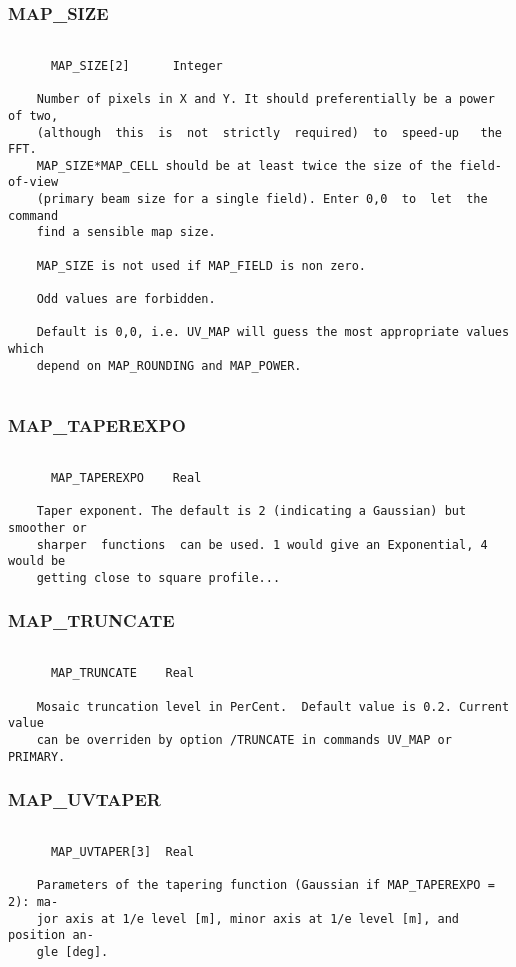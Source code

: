 \subsubsection{MAP\_SIZE}
\begin{verbatim}

      MAP_SIZE[2]      Integer

    Number of pixels in X and Y. It should preferentially be a power of two,
    (although  this  is  not  strictly  required)  to  speed-up   the   FFT.
    MAP_SIZE*MAP_CELL should be at least twice the size of the field-of-view
    (primary beam size for a single field). Enter 0,0  to  let  the  command
    find a sensible map size.

    MAP_SIZE is not used if MAP_FIELD is non zero.

    Odd values are forbidden.

    Default is 0,0, i.e. UV_MAP will guess the most appropriate values which
    depend on MAP_ROUNDING and MAP_POWER.


\end{verbatim}
\subsubsection{MAP\_TAPEREXPO}
\begin{verbatim}

      MAP_TAPEREXPO    Real

    Taper exponent. The default is 2 (indicating a Gaussian) but smoother or
    sharper  functions  can be used. 1 would give an Exponential, 4 would be
    getting close to square profile...

\end{verbatim}
\subsubsection{MAP\_TRUNCATE}
\begin{verbatim}

      MAP_TRUNCATE    Real

    Mosaic truncation level in PerCent.  Default value is 0.2. Current value
    can be overriden by option /TRUNCATE in commands UV_MAP or PRIMARY.

\end{verbatim}
\subsubsection{MAP\_UVTAPER}
\begin{verbatim}

      MAP_UVTAPER[3]  Real

    Parameters of the tapering function (Gaussian if MAP_TAPEREXPO = 2): ma-
    jor axis at 1/e level [m], minor axis at 1/e level [m], and position an-
    gle [deg].

\end{verbatim}
